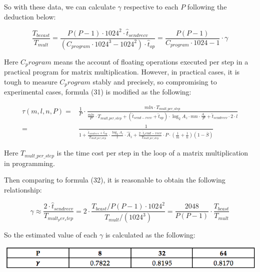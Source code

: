 \documentclass{amsart}
\theoremstyle{definition}
\theoremstyle{remark}
\numberwithin{equation}{section}
\begin{document}
So with these data, we can calculate $\gamma$ respective to each $P$ following the deduction below:

\begin{equation}
	\frac{T_{becast}}{T_{mult}} = \frac{P(P-1)\cdot 1024^{2} \cdot \hat{t}_{sendrecv}}{(C_{program} \cdot 1024^3 - 1024^2) \cdot \hat{t}_{op} } = \frac{P(P-1)}{C_{program} \cdot 1024 -1} \cdot \gamma
\end{equation}

Here $C_program$ means the account of floating operations executed per step in a practical program for matrix multiplication. However, in practical cases, it is tough to measure $C_program$ stably and precisely, so compromising to experimental cases, formula (31) is modified as the following:

\begin{equation} 
	\renewcommand\arraystretch{1.75}
	\begin{array}{rl}
	\tau(m,l,n,P) =& \frac{1}{P} \cdot \frac{mln \cdot T_{mult \_ per \_ step}}{\frac{mln}{P} \cdot T_{mult \_ per \_ step} + (\hat{t}_{send-recv} + \hat{t}_{op}) \cdot \log_{2} A_{z} \cdot mn \cdot \frac{A_{z}}{P} + \hat{t}_{sendrecv} \cdot 2 \cdot l}\\ 
	=& \frac{1}{1 + \frac{\hat{t}_{sendrecv} + \hat{t}_{op}}{T_{mult \_ per \_ step} } \cdot \frac{\log_{2} \hat{A}_{z}}{l} \cdot \hat{A}_{z} + \frac{2 \cdot \hat{t}_send-recv}{T_{mult \_ per \_ step}} \cdot P \cdot (\frac{1}{m} + \frac{1}{n})(1- \bar{S}) }
	\end{array}
\end{equation}

Here $T_{mult \_ per \_ step}$ is the time cost per step in the loop of a matrix multiplication in programming.
		
		Then comparing to formula (32), it is reasonable to obtain the following relationship:

\begin{equation}
\gamma \approx \frac{2 \cdot \hat{t}_{sendrecv}}{T_{mult_per_step}} = 2 \cdot \frac{T_{bcast} / P(P-1) \cdot 1024^2}{T_{mult}/(1024^3)} = \frac{2048}{P(P-1)} \cdot \frac{T_{bcast}}{T_{mult}}
\end{equation}

So the estimated value of each $\gamma$ is calculated as the following:

\includegraphics[scale=1]{figures/table_2.png}
\end{document}
